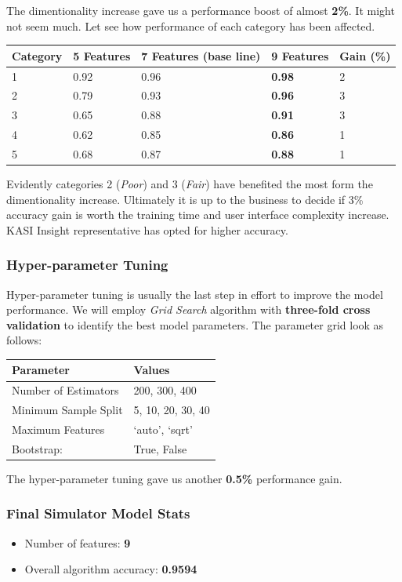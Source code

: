 The dimentionality increase gave us a performance boost of almost
\textbf{2\%}. It might not seem much. Let see how performance of each
category has been affected.

\begin{longtable}[]{@{}lllll@{}}
\toprule
Category & 5 Features & 7 Features (base line) & \textbf{9 Features} &
Gain (\%)\tabularnewline
\midrule
\endhead
1 & 0.92 & 0.96 & \textbf{0.98} & 2\tabularnewline
2 & 0.79 & 0.93 & \textbf{0.96} & 3\tabularnewline
3 & 0.65 & 0.88 & \textbf{0.91} & 3\tabularnewline
4 & 0.62 & 0.85 & \textbf{0.86} & 1\tabularnewline
5 & 0.68 & 0.87 & \textbf{0.88} & 1\tabularnewline
\bottomrule
\end{longtable}

Evidently categories 2 (\emph{Poor}) and 3 (\emph{Fair}) have benefited
the most form the dimentionality increase. Ultimately it is up to the
business to decide if 3\% accuracy gain is worth the training time and
user interface complexity increase. KASI Insight representative has
opted for higher accuracy.

\hypertarget{hyper-parameter-tuning}{%
\subsubsection{Hyper-parameter Tuning}\label{hyper-parameter-tuning}}

Hyper-parameter tuning is usually the last step in effort to improve the
model performance. We will employ \emph{Grid Search} algorithm with
\textbf{three-fold cross validation} to identify the best model
parameters. The parameter grid look as follows:

\begin{longtable}[]{@{}ll@{}}
\toprule
Parameter & Values\tabularnewline
\midrule
\endhead
Number of Estimators & 200, 300, 400\tabularnewline
Minimum Sample Split & 5, 10, 20, 30, 40\tabularnewline
Maximum Features & `auto', `sqrt'\tabularnewline
Bootstrap: & True, False\tabularnewline
\bottomrule
\end{longtable}

The hyper-parameter tuning gave us another \textbf{0.5\%} performance
gain.

\hypertarget{final-simulator-model-stats}{%
\subsubsection{Final Simulator Model
Stats}\label{final-simulator-model-stats}}

\begin{itemize}
\tightlist
\item
  Number of features: \textbf{9}
\item
  Overall algorithm accuracy: \textbf{0.9594}
\end{itemize}


